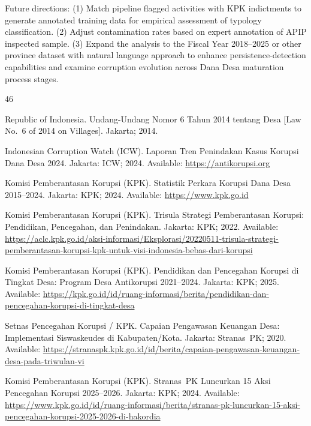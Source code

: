 \documentclass[3p,times,procedia]{elsarticle}
\begin{document}
Future directions: (1) Match pipeline flagged activities with KPK indictments to generate annotated training data for empirical assessment of typology classification. (2) Adjust contamination rates based on expert annotation of APIP inspected sample. (3) Expand the analysis to the Fiscal Year 2018–2025 or other province dataset with natural language approach to enhance persistence-detection capabilities and examine corruption evolution across Dana Desa maturation process stages.

\begin{thebibliography}{46}

Republic of Indonesia. Undang-Undang Nomor 6 Tahun 2014 tentang Desa [Law No.~6 of 2014 on Villages]. Jakarta; 2014.

Indonesian Corruption Watch (ICW). Laporan Tren Penindakan Kasus Korupsi Dana Desa 2024. Jakarta: ICW; 2024. Available: \url{https://antikorupsi.org}

Komisi Pemberantasan Korupsi (KPK). Statistik Perkara Korupsi Dana Desa 2015--2024. Jakarta: KPK; 2024. Available: \url{https://www.kpk.go.id}

Komisi Pemberantasan Korupsi (KPK). Trisula Strategi Pemberantasan Korupsi: Pendidikan, Pencegahan, dan Penindakan. Jakarta: KPK; 2022. Available: \url{https://aclc.kpk.go.id/aksi-informasi/Eksplorasi/20220511-trisula-strategi-pemberantasan-korupsi-kpk-untuk-visi-indonesia-bebas-dari-korupsi}

Komisi Pemberantasan Korupsi (KPK). Pendidikan dan Pencegahan Korupsi di Tingkat Desa: Program Desa Antikorupsi 2021--2024. Jakarta: KPK; 2025. Available: \url{https://kpk.go.id/id/ruang-informasi/berita/pendidikan-dan-pencegahan-korupsi-di-tingkat-desa}

Setnas Pencegahan Korupsi / KPK. Capaian Pengawasan Keuangan Desa: Implementasi Siswaskeudes di Kabupaten/Kota. Jakarta: Stranas~PK; 2020. Available: \url{https://stranaspk.kpk.go.id/id/berita/capaian-pengawasan-keuangan-desa-pada-triwulan-vi}

Komisi Pemberantasan Korupsi (KPK). Stranas~PK Luncurkan 15 Aksi Pencegahan Korupsi 2025--2026. Jakarta: KPK; 2024. Available: \url{https://www.kpk.go.id/id/ruang-informasi/berita/stranas-pk-luncurkan-15-aksi-pencegahan-korupsi-2025-2026-di-hakordia}


\end{thebibliography}
\end{document}
